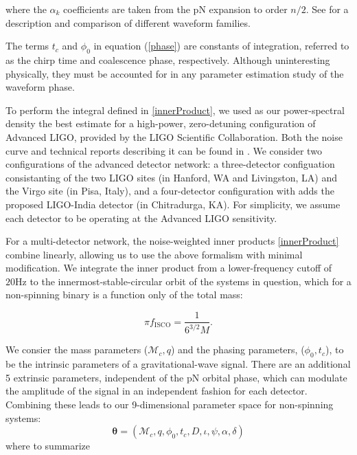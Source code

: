 \documentclass[11pt,a4paper]{emulateapj}
\newcommand{\thpara}{\boldsymbol{\theta}}
\newcommand{\chmass}{\mathcal{M}_c}
\begin{document}
\noindent where the $\alpha_{k}$ coefficients are taken from the pN expansion to order $n/2$.  See \cite{BuonannoWaveform} for a description and comparison of different waveform families.

The terms $t_c$ and $\phi_0$ in equation (\ref{phase}) are constants
of integration, referred to as the chirp time and coalescence phase,
respectively.  Although uninteresting physically, they must be
accounted for in any parameter estimation study of the waveform phase.

To perform the integral defined in \eqref{innerProduct}, we used as our power-spectral
density the best estimate for a high-power, zero-detuning configuration of Advanced 
LIGO, provided by the LIGO Scientific Collaboration.  Both the noise curve and technical 
reports describing it can be found in \cite{ADVLIGONoise}.
We consider two configurations of the advanced detector
network: a three-detector configuation consistanting of the two LIGO sites 
(in Hanford, WA and Livingston, LA) and the Virgo site (in Pisa, Italy), and a 
four-detector configuration with adds the proposed LIGO-India detector
(in Chitradurga, KA).  For simplicity, we assume each detector to be 
operating at the Advanced LIGO sensitivity. 


For a multi-detector network, the noise-weighted inner products
\eqref{innerProduct} combine linearly, allowing us to use the above
formalism with minimal modification.  We integrate the inner product
from a lower-frequency cutoff of $20\text{Hz}$ to the
innermost-stable-circular orbit of the systems in question, which for a
non-spinning binary is a function only of the total mass:

\begin{equation}
  \pi f_{\text{ISCO}} = \frac{1}{6^{3/2}M}.
  \label{ISCOFrequency}
\end{equation}
   
We consier the mass parameters ($\chmass,q$) and the phasing parameters,
($\phi_0,t_c$), to be the intrinsic parameters of a gravitational-wave signal.  There 
are an additional 5 extrinsic parameters, independent of the pN orbital phase, which can
modulate the amplitude of the signal in an independent fashion for each detector.  
Combining these leads to our 9-dimensional parameter space for non-spinning systems:
\begin{equation}
\thpara =  (\chmass, q, \phi_0,t_c,D,\iota,\psi,\alpha,\delta)
\label{parameterspace}
\end{equation}
where to summarize
\end{document}
